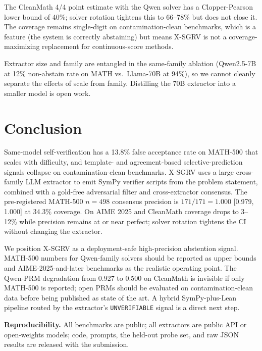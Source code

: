 \documentclass{article}
\begin{document}
The CleanMath 4/4 point estimate with the Qwen solver has a Clopper-Pearson lower bound of 40\%; solver rotation tightens this to 66--78\% but does not close it. The coverage remains single-digit on contamination-clean benchmarks, which is a feature (the system is correctly abstaining) but means X-SGRV is not a coverage-maximizing replacement for continuous-score methods.

Extractor size and family are entangled in the same-family ablation (Qwen2.5-7B at 12\% non-abstain rate on MATH vs.\ Llama-70B at 94\%), so we cannot cleanly separate the effects of scale from family. Distilling the 70B extractor into a smaller model is open work.

\section{Conclusion}

Same-model self-verification has a 13.8\% false acceptance rate on MATH-500 that scales with difficulty, and template- and agreement-based selective-prediction signals collapse on contamination-clean benchmarks. X-SGRV uses a large cross-family LLM extractor to emit SymPy verifier scripts from the problem statement, combined with a gold-free adversarial filter and cross-extractor consensus. The pre-registered MATH-500 $n{=}498$ consensus precision is $171/171 = 1.000$ [0.979, 1.000] at 34.3\% coverage. On AIME 2025 and CleanMath coverage drops to 3--12\% while precision remains at or near perfect; solver rotation tightens the CI without changing the extractor.

We position X-SGRV as a deployment-safe high-precision abstention signal. MATH-500 numbers for Qwen-family solvers should be reported as upper bounds and AIME-2025-and-later benchmarks as the realistic operating point. The Qwen-PRM degradation from 0.927 to 0.500 on CleanMath is invisible if only MATH-500 is reported; open PRMs should be evaluated on contamination-clean data before being published as state of the art. A hybrid SymPy-plus-Lean pipeline routed by the extractor's \texttt{UNVERIFIABLE} signal is a direct next step.

\textbf{Reproducibility.} All benchmarks are public; all extractors are public API or open-weights models; code, prompts, the held-out probe set, and raw JSON results are released with the submission.



\end{document}
